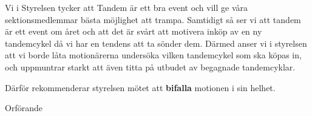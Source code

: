 \documentclass[../_main/handlingar.tex]{subfiles}
\begin{document}
\motionssvar

Vi i Styrelsen tycker att Tandem är ett bra event och vill ge våra sektionsmedlemmar bästa möjlighet att trampa. Samtidigt så ser vi att tandem är ett event om året och att det är svårt att motivera inköp av en ny tandemcykel då vi har en tendens att ta sönder dem. Därmed anser vi i styrelsen att vi borde låta motionärerna undersöka vilken tandemcykel som ska köpas in, och uppmuntrar starkt att även titta på utbudet av begagnade tandemcyklar. 

Därför rekommenderar styrelsen mötet att \textbf{bifalla} motionen i sin helhet.


\begin{signatures}{1}
    \ist
    \signature{\ordf}{Orförande}
\end{signatures}
\end{document}
